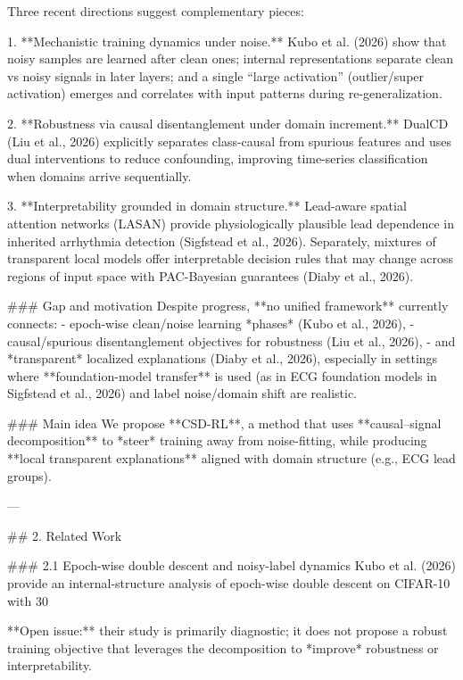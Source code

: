 Three recent directions suggest complementary pieces:

1. **Mechanistic training dynamics under noise.** Kubo et al. (2026) show that noisy samples are learned after clean ones; internal representations separate clean vs noisy signals in later layers; and a single “large activation” (outlier/super activation) emerges and correlates with input patterns during re-generalization.

2. **Robustness via causal disentanglement under domain increment.** DualCD (Liu et al., 2026) explicitly separates class-causal from spurious features and uses dual interventions to reduce confounding, improving time-series classification when domains arrive sequentially.

3. **Interpretability grounded in domain structure.** Lead-aware spatial attention networks (LASAN) provide physiologically plausible lead dependence in inherited arrhythmia detection (Sigfstead et al., 2026). Separately, mixtures of transparent local models offer interpretable decision rules that may change across regions of input space with PAC-Bayesian guarantees (Diaby et al., 2026).

### Gap and motivation  
Despite progress, **no unified framework** currently connects:
- epoch-wise clean/noise learning *phases* (Kubo et al., 2026),
- causal/spurious disentanglement objectives for robustness (Liu et al., 2026),
- and *transparent* localized explanations (Diaby et al., 2026),
especially in settings where **foundation-model transfer** is used (as in ECG foundation models in Sigfstead et al., 2026) and label noise/domain shift are realistic.

### Main idea  
We propose **CSD-RL**, a method that uses **causal–signal decomposition** to *steer* training away from noise-fitting, while producing **local transparent explanations** aligned with domain structure (e.g., ECG lead groups).

---

## 2. Related Work  

### 2.1 Epoch-wise double descent and noisy-label dynamics  
Kubo et al. (2026) provide an internal-structure analysis of epoch-wise double descent on CIFAR-10 with 30%

**Open issue:** their study is primarily diagnostic; it does not propose a robust training objective that leverages the decomposition to *improve* robustness or interpretability.

